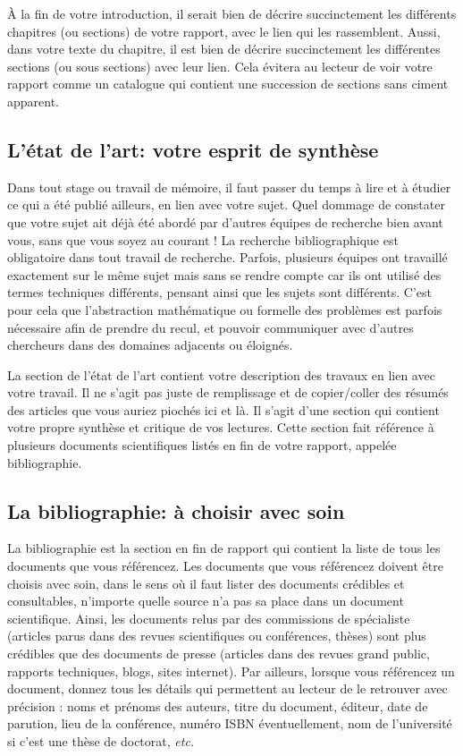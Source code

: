 \documentclass{rapport}
\def\etc{\textit{etc.}\xspace}
\begin{document}
        À la fin de votre introduction, il serait bien de décrire succinctement les différents chapitres (ou sections) de votre rapport, avec le lien qui les rassemblent. Aussi, dans votre texte du chapitre, il est bien de décrire succinctement les différentes sections (ou sous sections) avec leur lien. Cela évitera au lecteur de voir votre rapport comme un catalogue qui contient une succession de sections sans ciment apparent.

      \subsection{L'état de l'art: votre esprit de synthèse} 
        Dans tout stage ou travail de mémoire, il faut passer du temps à lire et à étudier ce qui a été publié ailleurs, en lien avec votre sujet. Quel dommage de constater que votre sujet ait déjà été abordé par d'autres équipes de recherche bien avant vous, sans que vous soyez au courant ! La recherche bibliographique est obligatoire dans tout travail de recherche. Parfois, plusieurs équipes ont travaillé exactement sur le même sujet mais sans se rendre compte car ils ont utilisé des termes techniques différents, pensant ainsi que les sujets sont différents. C'est pour cela que l'abstraction mathématique ou formelle des problèmes est parfois nécessaire afin de prendre du recul, et pouvoir communiquer avec d'autres chercheurs dans des domaines adjacents ou éloignés.

        La section de l'état de l'art contient votre description des travaux en lien avec votre travail. Il ne s'agit pas juste de remplissage et de copier/coller des résumés des articles que vous auriez piochés ici et là. Il s'agit d'une section qui contient votre propre synthèse et critique de vos lectures. Cette section fait référence à plusieurs documents scientifiques listés en fin de votre rapport, appelée bibliographie. 

      \subsection{La bibliographie: à choisir avec soin} 
        La bibliographie est la section en fin de rapport qui contient la liste de tous les documents que vous référencez. Les documents que vous référencez doivent être choisis avec soin, dans le sens où il faut lister des documents crédibles et consultables, n'importe quelle source n'a pas sa place dans un document scientifique. Ainsi, les documents relus par des commissions de spécialiste (articles parus dans des revues scientifiques ou conférences, thèses) sont plus crédibles que des documents de presse (articles dans des revues grand public, rapports techniques, blogs, sites internet). Par ailleurs, lorsque vous référencez un document, donnez tous les détails qui permettent au lecteur de le retrouver avec précision : noms et prénoms des auteurs, titre du document, éditeur, date de parution, lieu de la conférence, numéro ISBN éventuellement, nom de l'université si c'est une thèse de doctorat, \etc 
        
\end{document}
